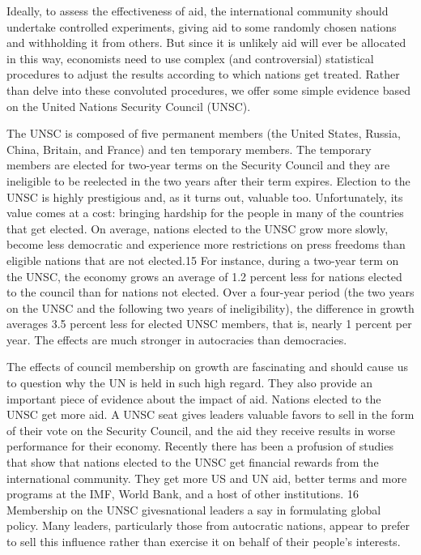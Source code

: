 \documentclass[10pt]{article}
\begin{document}
{\large Ideally, to assess the effectiveness of aid, the international community
should undertake controlled experiments, giving aid to some randomly chosen
nations and withholding it from others. But since it is unlikely aid will ever be
allocated in this way, economists need to use complex (and controversial)
statistical procedures to adjust the results according to which nations get
treated. Rather than delve into these convoluted procedures, we offer some simple
evidence based on the United Nations Security Council (UNSC).}

{\large The UNSC is composed of five permanent members (the United States,
Russia, China, Britain, and France) and ten temporary members. The temporary
members are elected for two-year terms on the Security Council and they are
ineligible to be reelected in the two years after their term expires. Election to
the UNSC is highly prestigious and, as it turns out, valuable too. Unfortunately,
its value comes at a cost: bringing hardship for the people in many of the
countries that get elected. On average, nations elected to the UNSC grow more
slowly, become less democratic and experience more restrictions on press freedoms
than eligible nations that are not elected.15 For instance, during a two-year
term on the UNSC, the economy grows an average of 1.2 percent less for nations
elected to the council than for nations not elected. Over a four-year period (the
two years on the UNSC and the following two years of ineligibility), the
difference in growth averages 3.5 percent less for elected UNSC members, that is,
nearly 1 percent per year. The effects are much stronger in autocracies than
democracies.}

{\large The effects of council membership on growth are fascinating and should
cause us to question why the UN is held in such high regard. They also provide an
important piece of evidence about the impact of aid. Nations elected to the UNSC
get more aid. A UNSC seat gives leaders valuable favors to sell in the form of
their vote on the Security Council, and the aid they receive results in worse
performance for their economy. Recently there has been a profusion of studies
that show that nations elected to the UNSC get financial rewards from the
international community. They get more US and UN aid, better terms and more
programs at the IMF, World Bank, and a host of other institutions. 16 Membership
on the UNSC givesnational leaders a say in formulating global policy. Many
leaders, particularly those from autocratic nations, appear to prefer to sell
this influence rather than exercise it on behalf of their people's interests.}
\end{document}
